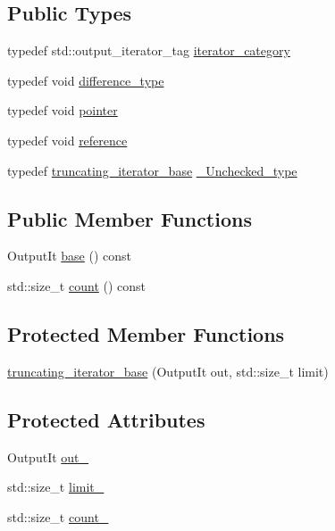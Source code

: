 \subsection*{Public Types}
\begin{DoxyCompactItemize}
\item 
typedef std\+::output\+\_\+iterator\+\_\+tag \hyperlink{classinternal_1_1truncating__iterator__base_afd8b0b0e6b6731cabb88b973663996da}{iterator\+\_\+category}
\item 
typedef void \hyperlink{classinternal_1_1truncating__iterator__base_a1de427247bb2d6ff61298ce48f5fec8d}{difference\+\_\+type}
\item 
typedef void \hyperlink{classinternal_1_1truncating__iterator__base_ab92c92d6ee81f9d2ebe602f3f30221db}{pointer}
\item 
typedef void \hyperlink{classinternal_1_1truncating__iterator__base_ae3802d66130989a3717422e196ca4a92}{reference}
\item 
typedef \hyperlink{classinternal_1_1truncating__iterator__base}{truncating\+\_\+iterator\+\_\+base} \hyperlink{classinternal_1_1truncating__iterator__base_a86f622767ff73e08480a19d3b4edde90}{\+\_\+\+Unchecked\+\_\+type}
\end{DoxyCompactItemize}
\subsection*{Public Member Functions}
\begin{DoxyCompactItemize}
\item 
Output\+It \hyperlink{classinternal_1_1truncating__iterator__base_a9448497520d8f10cee98ce6c41a57d70}{base} () const
\item 
std\+::size\+\_\+t \hyperlink{classinternal_1_1truncating__iterator__base_a14dfca041b5ab9ab7e8a6f35fef06a5b}{count} () const
\end{DoxyCompactItemize}
\subsection*{Protected Member Functions}
\begin{DoxyCompactItemize}
\item 
\hyperlink{classinternal_1_1truncating__iterator__base_a2258c919b872d848184e9fc1b7dbdf3a}{truncating\+\_\+iterator\+\_\+base} (Output\+It out, std\+::size\+\_\+t limit)
\end{DoxyCompactItemize}
\subsection*{Protected Attributes}
\begin{DoxyCompactItemize}
\item 
Output\+It \hyperlink{classinternal_1_1truncating__iterator__base_ad71c2995e490bc04f31c7981a1b84e42}{out\+\_\+}
\item 
std\+::size\+\_\+t \hyperlink{classinternal_1_1truncating__iterator__base_ad244bae44f3628e1bd8f78584e404649}{limit\+\_\+}
\item 
std\+::size\+\_\+t \hyperlink{classinternal_1_1truncating__iterator__base_acd98513e96d00a0d34164ad91533bbf7}{count\+\_\+}
\end{DoxyCompactItemize}


